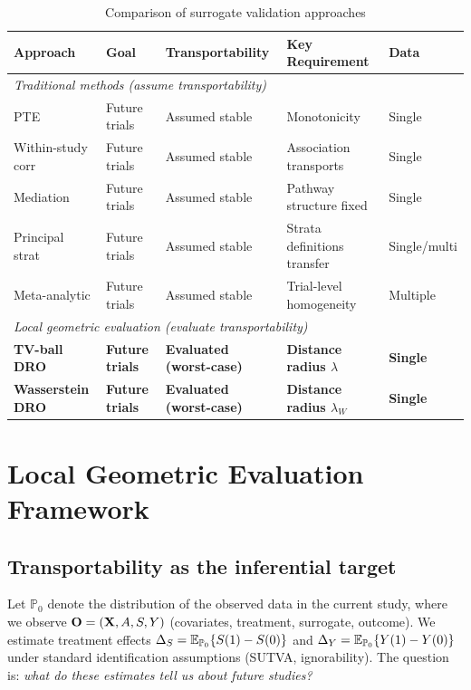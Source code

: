 \documentclass{article}
\newcommand{\PP}{\mathbb{P}}
\begin{document}
\begin{table}[htbp]
\centering
\caption{Comparison of surrogate validation approaches}
\label{tab:comparison}
\begin{tabular}{lllll}
\toprule
Approach & Goal & Transportability & Key Requirement & Data \\
\midrule
\multicolumn{5}{l}{\textit{Traditional methods (assume transportability)}} \\
\quad PTE \cite{chen2003pte} & Future trials & Assumed stable & Monotonicity & Single \\
\quad Within-study corr & Future trials & Assumed stable & Association transports & Single \\
\quad Mediation \cite{vanderweele2015mediation} & Future trials & Assumed stable & Pathway structure fixed & Single \\
\quad Principal strat \cite{frangakis2002principal} & Future trials & Assumed stable & Strata definitions transfer & Single/multi \\
\quad Meta-analytic \cite{buyse2000validation} & Future trials & Assumed stable & Trial-level homogeneity & Multiple \\
\midrule
\multicolumn{5}{l}{\textit{Local geometric evaluation (evaluate transportability)}} \\
\quad \textbf{TV-ball DRO} & \textbf{Future trials} & \textbf{Evaluated (worst-case)} & \textbf{Distance radius $\lambda$} & \textbf{Single} \\
\quad \textbf{Wasserstein DRO} & \textbf{Future trials} & \textbf{Evaluated (worst-case)} & \textbf{Distance radius $\lambda_W$} & \textbf{Single} \\
\bottomrule
\end{tabular}
\end{table}

\section{Local Geometric Evaluation Framework}\label{sec:framework}

\subsection{Transportability as the inferential target}

Let $\PP_0$ denote the distribution of the observed data in the current study, where we observe $\mathbf{O} = (\mathbf{X}, A, S, Y)$ (covariates, treatment, surrogate, outcome). We estimate treatment effects $\Delta_S = \E_{\PP_0}\{S(1) - S(0)\}$ and $\Delta_Y = \E_{\PP_0}\{Y(1) - Y(0)\}$ under standard identification assumptions (SUTVA, ignorability). The question is: \emph{what do these estimates tell us about future studies?}
\end{document}
